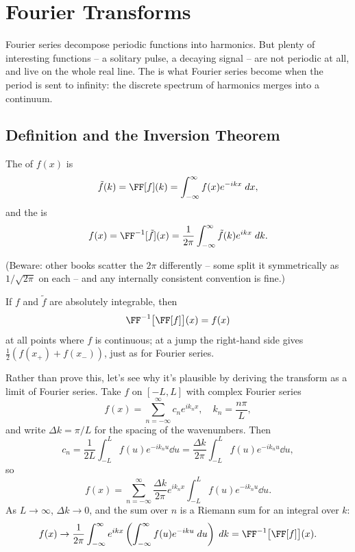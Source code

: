 \documentclass[a4paper]{scrartcl}
\begin{document}
\section{Fourier Transforms}

Fourier series decompose periodic functions into harmonics. But plenty of interesting functions -- a solitary pulse, a decaying signal -- are not periodic at all, and live on the whole real line. The  is what Fourier series become when the period is sent to infinity: the discrete spectrum of harmonics merges into a continuum.

\subsection{Definition and the Inversion Theorem}

\begin{definition}
    The  of $f(x)$ is
    $$
    \tilde{f}(k) = \FF[f](k) = \int_{-\infty}^{\infty} f(x) e^{-ikx} \dd x,
    $$
    and the  is
    $$
    f(x) = \FF^{-1}[\tilde f](x) = \frac{1}{2\pi} \int_{-\infty}^{\infty} \tilde{f}(k) e^{ikx} \dd k.
    $$
\end{definition}

(Beware: other books scatter the $2\pi$ differently -- some split it symmetrically as $1/\sqrt{2\pi}$ on each -- and any internally consistent convention is fine.)

\begin{theorem}
    If $f$ and $\tilde f$ are absolutely integrable, then
    $$
    \FF^{-1}\big[\FF[f]\big](x) = f(x)
    $$
    at all points where $f$ is continuous; at a jump the right-hand side gives $\frac{1}{2}(f(x_+) + f(x_-))$, just as for Fourier series.
\end{theorem}

Rather than prove this, let's see why it's plausible by deriving the transform as a limit of Fourier series. Take $f$ on $[-L, L]$ with complex Fourier series
$$
f(x) = \sum_{n = -\infty}^{\infty} c_n e^{i k_n x}, \quad k_n = \frac{n \pi}{L},
$$
and write $\Delta k = \pi/L$ for the spacing of the wavenumbers. Then
$$
c_n = \frac{1}{2L}\int_{-L}^{L} f(u) e^{-i k_n u} \dd u = \frac{\Delta k}{2 \pi} \int_{-L}^L f(u) e^{-i k_n u} \dd u,
$$
so
$$
f(x) = \sum_{n = -\infty}^{\infty} \frac{\Delta k}{2 \pi} e^{i k_n x} \int_{-L}^{L} f(u) e^{-i k_n u} \dd u.
$$
As $L \rightarrow \infty$, $\Delta k \rightarrow 0$, and the sum over $n$ is a Riemann sum for an integral over $k$:
$$
f(x) \rightarrow \frac{1}{2 \pi}\int_{-\infty}^{\infty} e^{ikx}\left(\int_{-\infty}^{\infty} f(u) e^{-iku} \dd u\right) \dd k = \FF^{-1}\big[\FF [f]\big](x).
$$
\end{document}
